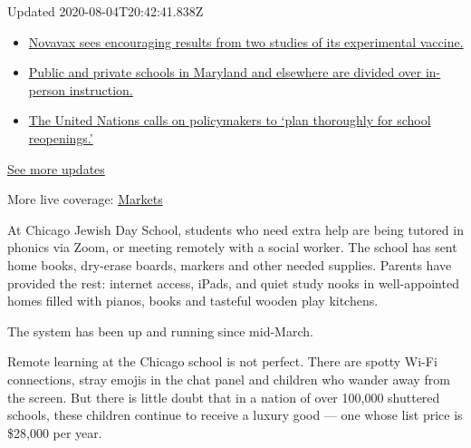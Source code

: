 Updated 2020-08-04T20:42:41.838Z

\begin{itemize}
\tightlist
\item
  \href{https://www.nytimes.com/2020/08/04/world/coronavirus-cases.html?action=click\&pgtype=Article\&state=default\&region=MAIN_CONTENT_1\&context=storylines_live_updates\#link-1228a480}{Novavax
  sees encouraging results from two studies of its experimental
  vaccine.}
\item
  \href{https://www.nytimes.com/2020/08/04/world/coronavirus-cases.html?action=click\&pgtype=Article\&state=default\&region=MAIN_CONTENT_1\&context=storylines_live_updates\#link-4825b93}{Public
  and private schools in Maryland and elsewhere are divided over
  in-person instruction.}
\item
  \href{https://www.nytimes.com/2020/08/04/world/coronavirus-cases.html?action=click\&pgtype=Article\&state=default\&region=MAIN_CONTENT_1\&context=storylines_live_updates\#link-50f7386d}{The
  United Nations calls on policymakers to `plan thoroughly for school
  reopenings.'}
\end{itemize}

\href{https://www.nytimes.com/2020/08/04/world/coronavirus-cases.html?action=click\&pgtype=Article\&state=default\&region=MAIN_CONTENT_1\&context=storylines_live_updates}{See
more updates}

More live coverage:
\href{https://www.nytimes.com/live/2020/08/04/business/stock-market-today-coronavirus?action=click\&pgtype=Article\&state=default\&region=MAIN_CONTENT_1\&context=storylines_live_updates}{Markets}

At Chicago Jewish Day School, students who need extra help are being
tutored in phonics via Zoom, or meeting remotely with a social worker.
The school has sent home books, dry-erase boards, markers and other
needed supplies. Parents have provided the rest: internet access, iPads,
and quiet study nooks in well-appointed homes filled with pianos, books
and tasteful wooden play kitchens.

The system has been up and running since mid-March.

Remote learning at the Chicago school is not perfect. There are spotty
Wi-Fi connections, stray emojis in the chat panel and children who
wander away from the screen. But there is little doubt that in a nation
of over 100,000 shuttered schools, these children continue to receive a
luxury good --- one whose list price is \$28,000 per year.

